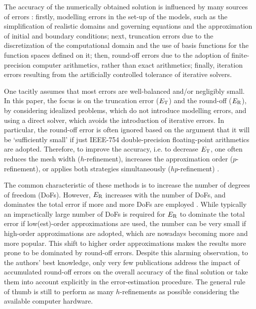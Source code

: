 \documentclass[review,3p]{elsarticle}
\begin{document}
The accuracy of the numerically obtained solution is influenced by many sources of errors \cite{ferziger2012computational}: firstly, modelling errors in the set-up of the models, such as the simplification of realistic domains and governing equations and the approximation of initial and boundary conditions; next, truncation errors due to the discretization of the computational domain and the use of basis functions for the function spaces defined on it; then, round-off errors due to the adoption of finite-precision computer arithmetics, rather than exact arithmetics; finally, iteration errors resulting from the artificially controlled tolerance of iterative solvers. 

One tacitly assumes that most errors are well-balanced and/or negligibly small. In this paper, the focus is on the truncation error ($E_{\rm T}$) and the round-off ($E_{\rm R}$), by considering idealized problems, which do not introduce modelling errors, and using a direct solver, which avoids the introduction of iterative errors. In particular, the round-off error is often ignored based on the argument that it will be `sufficiently small' if just IEEE-754 double-precision floating-point arithmetics \cite{zuras2008ieee} are adopted. Therefore, to improve the accuracy, i.e. to decrease $E_{\rm T}$, one often reduces the mesh width ($h$-refinement), increases the approximation order ($p$-refinement), or applies both strategies simultaneously ($hp$-refinement) \cite{guo1986hp,gockenbach2006understanding}. 

The common characteristic of these methods is to increase the number of degrees of freedom (DoFs).
However, $E_{\rm R}$ increases with the number of DoFs, and dominates the total error if more and more DoFs are employed \cite{alvarez2012round,Babuska2018Roundoff}. While typically an impractically large number of DoFs is required for $E_{\rm R}$ to dominate the total error if low(est)-order approximations are used, the number can be very small if high-order approximations are adopted, which are nowadays becoming more and more popular. This shift to higher order approximations makes the results more prone to be dominated by round-off errors. Despite this alarming observation, to the authors’ best knowledge, only very few publications address the impact of accumulated round-off errors on the overall accuracy of the final solution or take them into account explicitly in the error-estimation procedure. The general rule of thumb is still to perform as many $h$-refinements as possible considering the available computer hardware.
\end{document}
